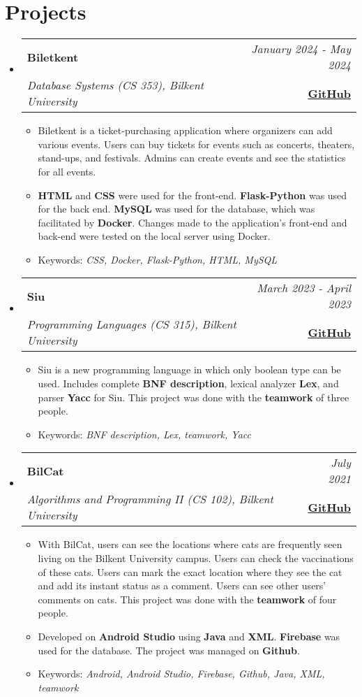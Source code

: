 \documentclass[a4paper,11pt]{article}
\makeatletter
\newcommand{\resumeProject}[4]{
\vspace{0.5mm}\item
    \begin{tabular*}{0.98\textwidth}[t]{l@{\extracolsep{\fill}}r}
    \textbf{#1} & \textit{\footnotesize{#3}} \\
    \footnotesize{\textit{#2}} & \footnotesize{#4}\end{tabular*}\vspace{-2.4mm}
}
\newcommand{\resumeSubHeadingListStart}{\begin{itemize}[leftmargin=*,labelsep=0mm]}
\newcommand{\resumeItemListStart}{\begin{justify}\begin{itemize}[leftmargin=3ex, rightmargin=2ex, noitemsep,labelsep=1.2mm,itemsep=0mm]\small}
\newcommand{\resumeSubHeadingListEnd}{\end{itemize}\vspace{2mm}}
\newcommand{\resumeItemListEnd}{\end{itemize}\end{justify}\vspace{-2mm}}
\makeatother
\begin{document}

\section{\textbf{Projects}}
    \resumeSubHeadingListStart
        \resumeProject
            {Biletkent} {Database Systems (CS 353), Bilkent University}
            {January 2024 - May 2024} {\href{https://github.com/memregn/Biletkent}{\textbf{\color{blue}GitHub}}}
                \resumeItemListStart
                    \item {Biletkent is a ticket-purchasing application where organizers can add various events. Users can buy tickets for events such as concerts, theaters, stand-ups, and festivals. Admins can create events and see the statistics for all events.}
                    \item {{\textbf{HTML}} and {\textbf{CSS}} were used for the front-end. {\textbf{Flask-Python}} was used for the back end. {\textbf{MySQL}} was used for the database, which was facilitated by {\textbf{Docker}}. Changes made to the application's front-end and back-end were tested on the local server using Docker.}
                    \item {Keywords: \emph{CSS, Docker, Flask-Python, HTML, MySQL}}
                \resumeItemListEnd
        \resumeProject
            {Siu} {Programming Languages (CS 315), Bilkent University}
            {March 2023 - April 2023} {\href{https://github.com/memregn/Siu}{\textbf{\color{blue}GitHub}}}
                \resumeItemListStart
                    \item {Siu is a new programming language in which only boolean type can be used. Includes complete {\textbf{BNF description}}, lexical analyzer {\textbf{Lex}}, and parser {\textbf{Yacc}} for Siu. This project was done with the {\textbf{teamwork}} of three people.}
                    \item {Keywords: \emph{BNF description, Lex, teamwork, Yacc}}
                \resumeItemListEnd
        \resumeProject
            {BilCat} {Algorithms and Programming II (CS 102), Bilkent University}
            {July 2021} {\href{https://github.com/memregn/BilCat}{\textbf{\color{blue}GitHub}}}
                \resumeItemListStart
                    \item {With BilCat, users can see the locations where cats are frequently seen living on the Bilkent University campus. Users can check the vaccinations of these cats. Users can mark the exact location where they see the cat and add its instant status as a comment. Users can see other users' comments on cats. This project was done with the {\textbf{teamwork}} of four people. }
                    \item {Developed on {\textbf{Android Studio}} using {\textbf{Java}} and {\textbf{XML}}. {\textbf{Firebase}} was used for the database. The project was managed on {\textbf{Github}}.}
                    \item {Keywords: \emph{Android, Android Studio, Firebase, Github, Java, XML, teamwork}}
                \resumeItemListEnd
    \resumeSubHeadingListEnd
\vspace{-6.5mm}
\end{document}
